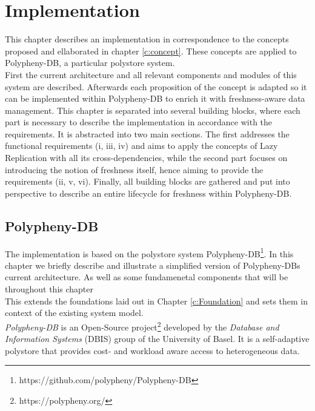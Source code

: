 \chapter{Implementation}
\label{c:implementation}

This chapter describes an implementation in correspondence to the concepts proposed and ellaborated in chapter \ref{c:concept}. 
These concepts are applied to Polypheny-DB, a particular polystore system.\\
First the current architecture and all relevant components and modules of this system are described. Afterwards each proposition of the concept is adapted
so it can be implemented within Polypheny-DB to enrich it with freshness-aware data management.
This chapter is separated into several building blocks, where each part is necessary to describe the implementation in accordance with the requirements.
It is abstracted into two main sections. The first addresses the functional requirements (i, iii, iv) and aims to apply the concepts of Lazy Replication with all its
cross-dependencies, while the second part focuses on introducing the notion of freshness itself, hence aiming to provide the requirements (ii, v, vi).
Finally, all building blocks are gathered and put into perspective to describe an entire lifecycle for freshness within Polypheny-DB. 





\section{Polypheny-DB}
\label{sec:architecture}


The implementation is based on the polystore system Polypheny-DB\footnote{https://github.com/polypheny/Polypheny-DB}.
In this chapter we briefly describe and illustrate a simplified version of Polypheny-DBs current architecture.
As well as some fundamenetal components that will be throughout this chapter\\
This extends the foundations laid out in Chapter \ref{c:Foundation} and sets them in context of the existing system model.\\




\emph{Polypheny-DB} is an Open-Source project\footnote{https://polypheny.org/} developed by 
the \textit{Database and Information Systems} (DBIS) group of the University of Basel.
It is a self-adaptive polystore that provides cost- and workload aware access to heterogeneous data\cite{poly2020}.

